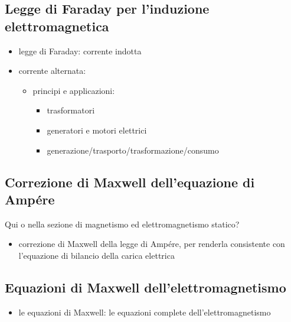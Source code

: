 \documentclass[letterpaper,10pt,italian]{jupyterBook}
\begin{document}
\subsection{Legge di Faraday per l’induzione elettromagnetica}
\label{\detokenize{ch/electromagnetism/electromagnetism-general:legge-di-faraday-per-l-induzione-elettromagnetica}}\begin{itemize}
\item {} 
\sphinxAtStartPar
legge di Faraday: corrente indotta

\item {} 
\sphinxAtStartPar
corrente alternata:
\begin{itemize}
\item {} 
\sphinxAtStartPar
principi e applicazioni:
\begin{itemize}
\item {} 
\sphinxAtStartPar
trasformatori

\item {} 
\sphinxAtStartPar
generatori e motori elettrici

\item {} 
\sphinxAtStartPar
generazione/trasporto/trasformazione/consumo

\end{itemize}

\end{itemize}

\end{itemize}


\subsection{Correzione di Maxwell dell’equazione di Ampére}
\label{\detokenize{ch/electromagnetism/electromagnetism-general:correzione-di-maxwell-dell-equazione-di-ampere}}
\sphinxAtStartPar
 Qui o nella sezione di magnetismo ed elettromagnetismo statico? 
\begin{itemize}
\item {} 
\sphinxAtStartPar
correzione di Maxwell della legge di Ampére, per renderla consistente con l’equazione di bilancio della carica elettrica

\end{itemize}


\subsection{Equazioni di Maxwell dell’elettromagnetismo}
\label{\detokenize{ch/electromagnetism/electromagnetism-general:equazioni-di-maxwell-dell-elettromagnetismo}}\begin{itemize}
\item {} 
\sphinxAtStartPar
le equazioni di Maxwell: le equazioni complete dell’elettromagnetismo

\end{itemize}
\end{document}
